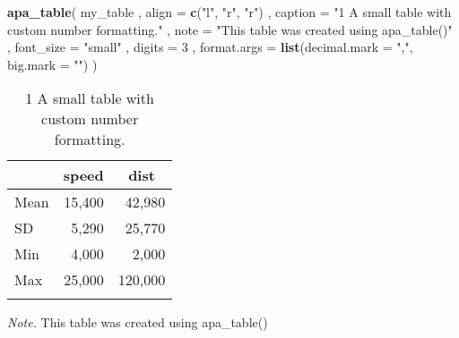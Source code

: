 \documentclass[english,man]{apa6}
\newenvironment{Shaded}{\begin{snugshade}}{\end{snugshade}}
\newcommand{\DataTypeTok}[1]{\textcolor[rgb]{0.13,0.29,0.53}{#1}}
\newcommand{\DecValTok}[1]{\textcolor[rgb]{0.00,0.00,0.81}{#1}}
\newcommand{\KeywordTok}[1]{\textcolor[rgb]{0.13,0.29,0.53}{\textbf{#1}}}
\newcommand{\NormalTok}[1]{#1}
\newcommand{\StringTok}[1]{\textcolor[rgb]{0.31,0.60,0.02}{#1}}
\begin{document}
\begin{Shaded}
\begin{Highlighting}[]
\KeywordTok{apa_table}\NormalTok{(}
\NormalTok{  my_table}
\NormalTok{  , }\DataTypeTok{align =} \KeywordTok{c}\NormalTok{(}\StringTok{"l"}\NormalTok{, }\StringTok{"r"}\NormalTok{, }\StringTok{"r"}\NormalTok{)}
\NormalTok{  , }\DataTypeTok{caption =} \StringTok{"1 A small table with custom number formatting."}
\NormalTok{  , }\DataTypeTok{note =} \StringTok{"This table was created using apa_table()"}
\NormalTok{  , }\DataTypeTok{font_size =} \StringTok{"small"}
\NormalTok{  , }\DataTypeTok{digits =} \DecValTok{3}
\NormalTok{  , }\DataTypeTok{format.args =} \KeywordTok{list}\NormalTok{(}\DataTypeTok{decimal.mark =} \StringTok{","}\NormalTok{, }\DataTypeTok{big.mark =} \StringTok{""}\NormalTok{)}
\NormalTok{)}
\end{Highlighting}
\end{Shaded}

\begin{table}[tbp]

\begin{center}
\begin{threeparttable}

\caption{\label{tab:unnamed-chunk-3}1 A small table with custom number formatting.}

\small{

\begin{tabular}{lrr}
\toprule
 & \multicolumn{1}{c}{speed} & \multicolumn{1}{c}{dist}\\
\midrule
Mean & 15,400 & 42,980\\
SD & 5,290 & 25,770\\
Min & 4,000 & 2,000\\
Max & 25,000 & 120,000\\
\bottomrule
\addlinespace
\end{tabular}

}

\begin{tablenotes}[para]
\normalsize{\textit{Note.} This table was created using apa\_table()}
\end{tablenotes}

\end{threeparttable}
\end{center}

\end{table}
\end{document}
